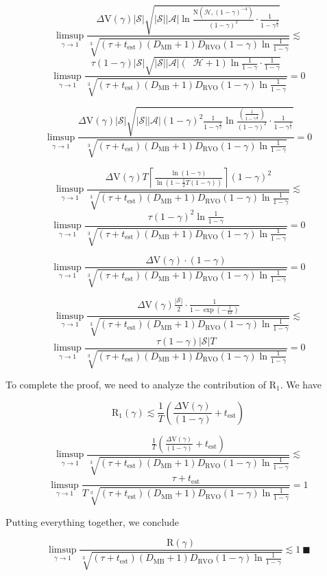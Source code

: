 \documentclass[a4paper]{article}
\newcommand{\AP}[1]{\left(#1\right)}
\newcommand{\Abs}[1]{\left\vert #1 \right\vert}
\newcommand{\Ceil}[1]{\left\lceil #1 \right\rceil}
\newcommand{\St}{\mathcal{S}}
\newcommand{\A}{\mathcal{A}}
\newcommand{\Hy}{\mathcal{H}}
\DeclareMathOperator{\MB}{\dim_{MB}}
\newcommand{\DRVO}{D_{\mathrm{RVO}}}
\newcommand{\DMB}{D_{\mathrm{MB}}}
\newcommand{\Est}{\mathrm{est}}
\newcommand{\V}{\mathrm{V}}
\newcommand{\Reg}{\mathrm{R}}
\newcommand{\N}{\mathrm{N}}
\begin{document}
$$\limsup_{\gamma \rightarrow 1}\frac{\Delta\V(\gamma)\Abs{\St}\sqrt{\Abs{\St}\Abs{\A}\ln{\frac{\N(\Hy,(1-\gamma)^{-4} )}{(1-\gamma)^2}}\cdot\frac{1}{1-\gamma^{\frac{1}{2}}}}}{\sqrt[3]{\AP{\tau+t_{\Est}}\AP{\DMB+1}\DRVO(1-\gamma)\ln{\frac{1}{1-\gamma}}}}\lesssim$$
$$\limsup_{\gamma \rightarrow 1}\frac{\tau(1-\gamma)\Abs{\St}\sqrt{\Abs{\St}\Abs{\A}\AP{\MB\Hy+1}\ln\frac{1}{1-\gamma}\cdot\frac{1}{1-\gamma}}}{\sqrt[3]{\AP{\tau+t_{\Est}}\AP{\DMB+1}\DRVO(1-\gamma)\ln{\frac{1}{1-\gamma}}}}=0$$

$$\limsup_{\gamma \rightarrow 1}\frac{\Delta\V(\gamma)\Abs{\St}\sqrt{\Abs{\St}\Abs{\A}(1-\gamma)^{2} \frac{1}{1-\gamma^{\frac{1}{2}}}\ln{\frac{\AP{\frac{1}{1-\gamma^{\frac{1}{2}}}}}{(1-\gamma)^2}}\cdot\frac{1}{1-\gamma^{\frac{1}{2}}}}}{\sqrt[3]{\AP{\tau+t_{\Est}}\AP{\DMB+1}\DRVO(1-\gamma)\ln{\frac{1}{1-\gamma}}}}=0$$

$$\limsup_{\gamma \rightarrow 1}\frac{\Delta\V(\gamma)T\Ceil{\frac{\ln(1-\gamma)}{\ln\AP{1-\frac{1}{2}T(1-\gamma)}}}(1-\gamma)^2}{\sqrt[3]{\AP{\tau+t_{\Est}}\AP{\DMB+1}\DRVO(1-\gamma)\ln{\frac{1}{1-\gamma}}}}\lesssim$$
$$\limsup_{\gamma \rightarrow 1}\frac{\tau(1-\gamma)^2\ln\frac{1}{1-\gamma}}{\sqrt[3]{\AP{\tau+t_{\Est}}\AP{\DMB+1}\DRVO(1-\gamma)\ln{\frac{1}{1-\gamma}}}}=0$$

$$\limsup_{\gamma \rightarrow 1}\frac{\Delta\V(\gamma)\cdot(1-\gamma)}{\sqrt[3]{\AP{\tau+t_{\Est}}\AP{\DMB+1}\DRVO(1-\gamma)\ln{\frac{1}{1-\gamma}}}}=0$$

$$\limsup_{\gamma \rightarrow 1}\frac{\Delta\V(\gamma)\frac{\Abs{\St}}{2}\cdot\frac{1}{1-\exp\AP{-\frac{1}{4T}}}}{\sqrt[3]{\AP{\tau+t_{\Est}}\AP{\DMB+1}\DRVO(1-\gamma)\ln{\frac{1}{1-\gamma}}}}\lesssim$$
$$\limsup_{\gamma \rightarrow 1}\frac{\tau(1-\gamma)\Abs{\St}T}{\sqrt[3]{\AP{\tau+t_{\Est}}\AP{\DMB+1}\DRVO(1-\gamma)\ln{\frac{1}{1-\gamma}}}}=0$$

To complete the proof, we need to analyze the contribution of $\Reg_1$. We have

$$\Reg_1(\gamma)\lesssim\frac{1}{T}\AP{\frac{\Delta\V(\gamma)}{(1-\gamma)}+t_\Est}$$

$$\limsup_{\gamma \rightarrow 1}\frac{\frac{1}{T}\AP{\frac{\Delta\V(\gamma)}{(1-\gamma)}+t_\Est}}{\sqrt[3]{\AP{\tau+t_{\Est}}\AP{\DMB+1}\DRVO(1-\gamma)\ln{\frac{1}{1-\gamma}}}}\lesssim$$
$$\limsup_{\gamma \rightarrow 1}\frac{\tau+t_\Est}{T\sqrt[3]{\AP{\tau+t_{\Est}}\AP{\DMB+1}\DRVO(1-\gamma)\ln{\frac{1}{1-\gamma}}}}=1$$

Putting everything together, we conclude

$$\limsup_{\gamma \rightarrow 1}\frac{\Reg(\gamma)}{\sqrt[3]{\AP{\tau+t_{\Est}}\AP{\DMB+1}\DRVO(1-\gamma)\ln{\frac{1}{1-\gamma}}}}\lesssim1\ \blacksquare$$
\end{document}

